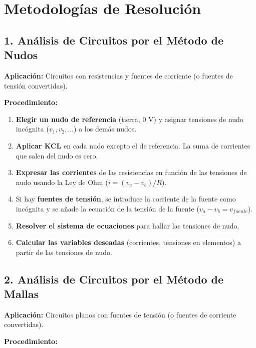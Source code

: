 \documentclass[11pt,a4paper]{article}
\begin{document}
\section*{Metodologías de Resolución}


\subsection*{1. Análisis de Circuitos por el Método de Nudos}


\textbf{Aplicación:} Circuitos con resistencias y fuentes de corriente (o fuentes de tensión convertidas).


\textbf{Procedimiento:}


\begin{enumerate}[leftmargin=*,topsep=2pt,itemsep=1pt]
  \item \textbf{Elegir un nudo de referencia} (tierra, 0 V) y asignar tensiones de nudo incógnita ($v_1, v_2, \dots$) a los demás nudos.
  \item \textbf{Aplicar KCL} en cada nudo excepto el de referencia. La suma de corrientes que salen del nudo es cero.
  \item \textbf{Expresar las corrientes} de las resistencias en función de las tensiones de nudo usando la Ley de Ohm ($i = (v_a - v_b)/R$).
  \item Si hay \textbf{fuentes de tensión}, se introduce la corriente de la fuente como incógnita y se añade la ecuación de la tensión de la fuente ($v_a - v_b = v_{fuente}$).
  \item \textbf{Resolver el sistema de ecuaciones} para hallar las tensiones de nudo.
  \item \textbf{Calcular las variables deseadas} (corrientes, tensiones en elementos) a partir de las tensiones de nudo.
\end{enumerate}


\subsection*{2. Análisis de Circuitos por el Método de Mallas}


\textbf{Aplicación:} Circuitos planos con fuentes de tensión (o fuentes de corriente convertidas).


\textbf{Procedimiento:}
\end{document}
